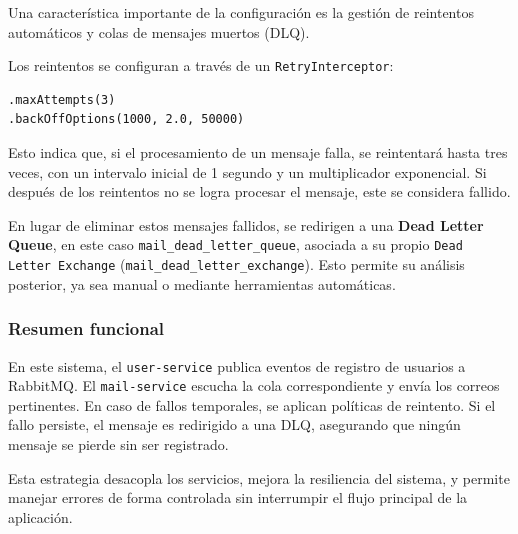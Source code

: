 Una característica importante de la configuración es la gestión de reintentos automáticos y colas de mensajes muertos (DLQ).

Los reintentos se configuran a través de un \texttt{RetryInterceptor}:
\begin{verbatim}
.maxAttempts(3)
.backOffOptions(1000, 2.0, 50000)
\end{verbatim}
Esto indica que, si el procesamiento de un mensaje falla, se reintentará hasta tres veces, con un intervalo inicial de 1 segundo y un multiplicador exponencial. Si después de los reintentos no se logra procesar el mensaje, este se considera fallido.

En lugar de eliminar estos mensajes fallidos, se redirigen a una \textbf{Dead Letter Queue}, en este caso \texttt{mail\_dead\_letter\_queue}, asociada a su propio \texttt{Dead Letter Exchange} (\texttt{mail\_dead\_letter\_exchange}). Esto permite su análisis posterior, ya sea manual o mediante herramientas automáticas.

\subsubsection{Resumen funcional}

En este sistema, el \texttt{user-service} publica eventos de registro de usuarios a RabbitMQ. El \texttt{mail-service} escucha la cola correspondiente y envía los correos pertinentes. En caso de fallos temporales, se aplican políticas de reintento. Si el fallo persiste, el mensaje es redirigido a una DLQ, asegurando que ningún mensaje se pierde sin ser registrado.

Esta estrategia desacopla los servicios, mejora la resiliencia del sistema, y permite manejar errores de forma controlada sin interrumpir el flujo principal de la aplicación.

